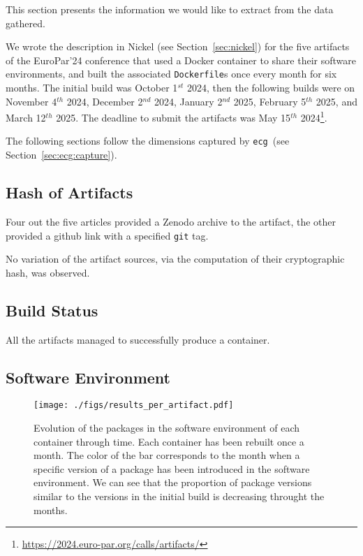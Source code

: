 \documentclass[sigconf,natbib=false]{acmart}
\newcommand{\df}{\texttt{Dockerfile}}
\newcommand{\ecg}{\texttt{ecg}}
\newcommand{\todo}[1]{{\color{red}{TODO: #1}}}
\begin{document}
This section presents the information we would like to extract from the data gathered.


We wrote the description in Nickel (see Section~\ref{sec:nickel}) for the five artifacts of the EuroPar'24 conference that used a Docker container to share their software environments, and built the associated \df s once every month for six months.
The initial build was October 1$^{st}$ 2024, then the following builds were on November 4$^{th}$ 2024, December 2$^{nd}$ 2024, January 2$^{nd}$ 2025, February 5$^{th}$ 2025, and March 12$^{th}$ 2025.
The deadline to submit the artifacts was May 15$^{th}$ 2024\footnote{\url{https://2024.euro-par.org/calls/artifacts/}}.

The following sections follow the dimensions captured by \ecg\ (see Section~\ref{sec:ecg:capture}).

\subsection{Hash of Artifacts}

Four out the five articles provided a Zenodo archive to the artifact, the other provided a github link with a specified \texttt{git} tag.

No variation of the artifact sources, via the computation of their cryptographic hash, was observed.

\subsection{Build Status}

All the artifacts managed to successfully produce a container.

\subsection{Software Environment}

\todo{check which base image, tag of base image and if apt-get update}

\begin{figure*}
  \centering
  \texttt{[image: ./figs/results\_per\_artifact.pdf]}
  \caption{
    Evolution of the packages in the software environment of each container through time.
    Each container has been rebuilt once a month.
    The color of the bar corresponds to the month when a specific version of a package has been introduced in the software environment.
    We can see that the proportion of package versions similar to the versions in the initial build is decreasing throught the months.
  }
  \label{fig:results_per_artifact}
\end{figure*}
\end{document}
